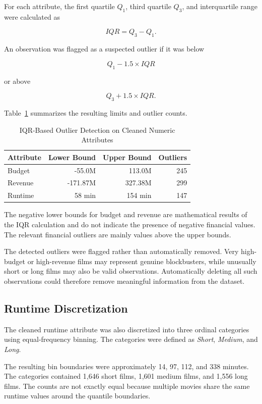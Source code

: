 \documentclass[conference]{IEEEtran}
\begin{document}
For each attribute, the first quartile $Q_1$, third quartile $Q_3$, and
interquartile range were calculated as

\[
IQR = Q_3 - Q_1.
\]

An observation was flagged as a suspected outlier if it was below

\[
Q_1 - 1.5 \times IQR
\]

or above

\[
Q_3 + 1.5 \times IQR.
\]

Table~\ref{tab:cleaning_outliers} summarizes the resulting limits and
outlier counts.

\begin{table}[t]
\caption{IQR-Based Outlier Detection on Cleaned Numeric Attributes}
\label{tab:cleaning_outliers}
\centering
\footnotesize
\begin{tabular}{lrrr}
\toprule
Attribute & Lower Bound & Upper Bound & Outliers \\
\midrule
Budget & -55.0M & 113.0M & 245 \\
Revenue & -171.87M & 327.38M & 299 \\
Runtime & 58 min & 154 min & 147 \\
\bottomrule
\end{tabular}
\end{table}

The negative lower bounds for budget and revenue are mathematical
results of the IQR calculation and do not indicate the presence of
negative financial values. The relevant financial outliers are mainly
values above the upper bounds.

The detected outliers were flagged rather than automatically removed.
Very high-budget or high-revenue films may represent genuine
blockbusters, while unusually short or long films may also be valid
observations. Automatically deleting all such observations could
therefore remove meaningful information from the dataset.


\subsection{Runtime Discretization}

The cleaned runtime attribute was also discretized into three ordinal
categories using equal-frequency binning. The categories were defined
as \textit{Short}, \textit{Medium}, and \textit{Long}.

The resulting bin boundaries were approximately 14, 97, 112, and
338 minutes. The categories contained 1,646 short films, 1,601 medium
films, and 1,556 long films. The counts are not exactly equal because
multiple movies share the same runtime values around the quantile
boundaries.
\end{document}
